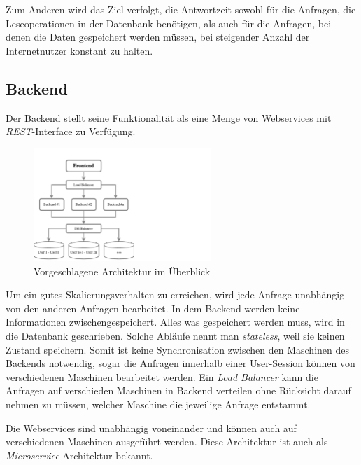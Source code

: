 Zum Anderen wird das Ziel verfolgt, die Antwortzeit sowohl für die Anfragen, die Leseoperationen in der Datenbank benötigen, als auch für die Anfragen, bei denen die Daten gespeichert werden müssen, bei steigender Anzahl der Internetnutzer konstant zu halten.

\subsection{Backend}

Der Backend stellt seine Funktionalität als eine Menge von Webservices mit \textit{REST}-Interface zu Verfügung.

\begin{figure}[H]
\centering
\includegraphics[trim = 0mm 0mm 0mm 0mm, clip, width=0.60\textwidth]{resources/ueberblickArchitektur}
\caption[Vorgeschlagene Architektur im Überblick]{Vorgeschlagene Architektur im Überblick}
\label{img:ueberblickArchitektur}
\end{figure}

Um ein gutes Skalierungsverhalten zu erreichen, wird jede Anfrage unabhängig von den anderen Anfragen bearbeitet. In dem Backend werden keine Informationen zwischengespeichert. Alles was gespeichert werden muss, wird in die Datenbank geschrieben. Solche Abläufe nennt man \textit{stateless}, weil sie keinen Zustand speichern. Somit ist keine Synchronisation zwischen den Maschinen des Backends notwendig, sogar die Anfragen innerhalb einer User-Session können von verschiedenen Maschinen bearbeitet werden. Ein \textit{Load Balancer} kann die Anfragen auf verschieden Maschinen in Backend verteilen ohne Rücksicht darauf nehmen zu müssen, welcher Maschine die jeweilige Anfrage entstammt.

Die Webservices sind unabhängig voneinander und können auch auf verschiedenen Maschinen ausgeführt werden. Diese Architektur ist auch als \textit{Microservice} Architektur bekannt.

